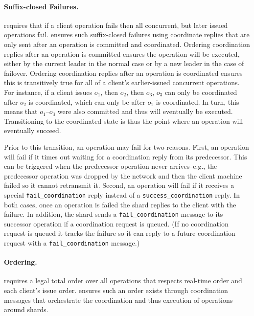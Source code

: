 \paragraph{Suffix-closed Failures.}
\Mdl{} requires that if a client operation fails then all concurrent, but later issued operations fail.
\sys{} ensures such suffix-closed failures using coordinate replies that are only sent after an operation is committed and coordinated.
Ordering coordination replies after an operation is committed ensures the operation will be executed, either by the current leader in the normal case or by a new leader in the case of failover.
Ordering coordination replies after an operation is coordinated ensures this is transitively true for all of a client's earlier-issued concurrent operations.
For instance, if a client issues $o_1$, then $o_2$, then $o_3$, $o_3$ can only be coordinated after $o_2$ is coordinated, which can only be after $o_1$ is coordinated.
In turn, this means that $o_1$--$o_3$ were also committed and thus will eventually be executed.
Transitioning to the coordinated state is thus the point where an operation will eventually succeed.

Prior to this transition, an operation may fail for two reasons.
First, an operation will fail if it times out waiting for a coordination reply from its predecessor.
This can be triggered when the predecessor operation never arrives--e.g., the predecessor operation was dropped by the network and then the client machine failed so it cannot retransmit it.
Second, an operation will fail if it receives a special \texttt{fail\_coordination} reply instead of a \texttt{success\_coordination} reply.
In both cases, once an operation is failed the shard replies to the client with the failure.
In addition, the shard sends a \texttt{fail\_coordination} message to its successor operation if a coordination request is queued.
(If no coordination request is queued it tracks the failure so it can reply to a future coordination request with a \texttt{fail\_coordination} message.)


\paragraph{\Mdl{} Ordering.}
\Mdl{} requires a legal total order over all operations that respects real-time order and each client's issue order.
\sys{} ensures such an order exists through coordination messages that orchestrate the coordination and thus execution of operations around shards.

